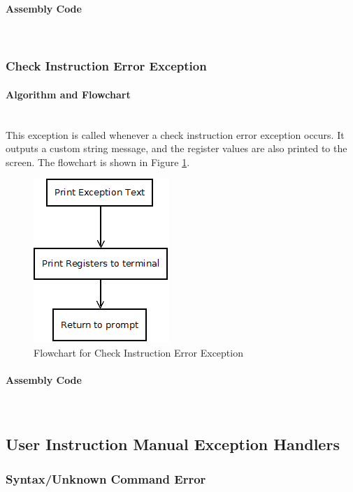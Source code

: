 \documentclass[12pt]{article}
\begin{document}
			\paragraph{Assembly Code}~\\		
					
			
			\subsubsection{Check Instruction Error Exception}
			\paragraph{Algorithm and Flowchart}~\\
			This exception is called whenever a check instruction error exception occurs. It outputs a custom string message, and the register values are also printed to the screen. The flowchart is shown in Figure \ref{fig:chk}.
			
			\begin{figure}[H]
				\centering
				\includegraphics[width=0.3\linewidth]{Exception}
				\caption{Flowchart for Check Instruction Error Exception}
				\label{fig:chk}
			\end{figure}
			\paragraph{Assembly Code}~\\			
				
			
			\subsection{User Instruction Manual Exception Handlers}
			
			\subsubsection{Syntax/Unknown Command Error}
\end{document}
